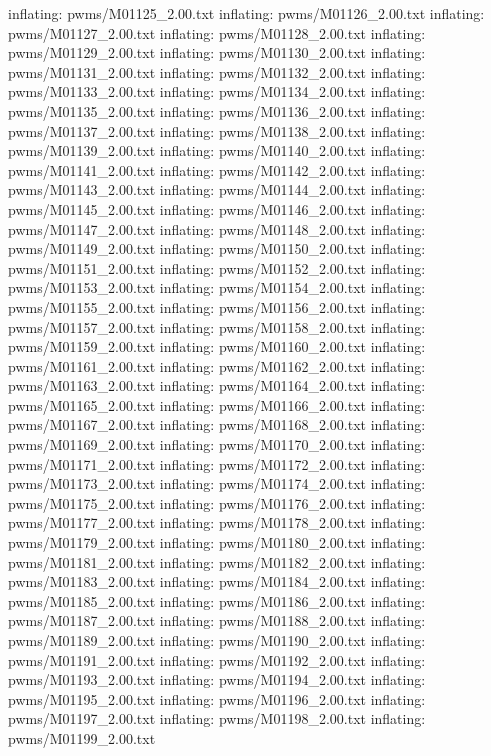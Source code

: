 \documentclass[letterpaper,10pt,english]{sphinxmanual}
\begin{document}
{\begin{sphinxVerbatim}[commandchars=\\\{\}]
  inflating: pwms/M01125\_2.00.txt
  inflating: pwms/M01126\_2.00.txt
  inflating: pwms/M01127\_2.00.txt
  inflating: pwms/M01128\_2.00.txt
  inflating: pwms/M01129\_2.00.txt
  inflating: pwms/M01130\_2.00.txt
  inflating: pwms/M01131\_2.00.txt
  inflating: pwms/M01132\_2.00.txt
  inflating: pwms/M01133\_2.00.txt
  inflating: pwms/M01134\_2.00.txt
  inflating: pwms/M01135\_2.00.txt
  inflating: pwms/M01136\_2.00.txt
  inflating: pwms/M01137\_2.00.txt
  inflating: pwms/M01138\_2.00.txt
  inflating: pwms/M01139\_2.00.txt
  inflating: pwms/M01140\_2.00.txt
  inflating: pwms/M01141\_2.00.txt
  inflating: pwms/M01142\_2.00.txt
  inflating: pwms/M01143\_2.00.txt
  inflating: pwms/M01144\_2.00.txt
  inflating: pwms/M01145\_2.00.txt
  inflating: pwms/M01146\_2.00.txt
  inflating: pwms/M01147\_2.00.txt
  inflating: pwms/M01148\_2.00.txt
  inflating: pwms/M01149\_2.00.txt
  inflating: pwms/M01150\_2.00.txt
  inflating: pwms/M01151\_2.00.txt
  inflating: pwms/M01152\_2.00.txt
  inflating: pwms/M01153\_2.00.txt
  inflating: pwms/M01154\_2.00.txt
  inflating: pwms/M01155\_2.00.txt
  inflating: pwms/M01156\_2.00.txt
  inflating: pwms/M01157\_2.00.txt
  inflating: pwms/M01158\_2.00.txt
  inflating: pwms/M01159\_2.00.txt
  inflating: pwms/M01160\_2.00.txt
  inflating: pwms/M01161\_2.00.txt
  inflating: pwms/M01162\_2.00.txt
  inflating: pwms/M01163\_2.00.txt
  inflating: pwms/M01164\_2.00.txt
  inflating: pwms/M01165\_2.00.txt
  inflating: pwms/M01166\_2.00.txt
  inflating: pwms/M01167\_2.00.txt
  inflating: pwms/M01168\_2.00.txt
  inflating: pwms/M01169\_2.00.txt
  inflating: pwms/M01170\_2.00.txt
  inflating: pwms/M01171\_2.00.txt
  inflating: pwms/M01172\_2.00.txt
  inflating: pwms/M01173\_2.00.txt
  inflating: pwms/M01174\_2.00.txt
  inflating: pwms/M01175\_2.00.txt
  inflating: pwms/M01176\_2.00.txt
  inflating: pwms/M01177\_2.00.txt
  inflating: pwms/M01178\_2.00.txt
  inflating: pwms/M01179\_2.00.txt
  inflating: pwms/M01180\_2.00.txt
  inflating: pwms/M01181\_2.00.txt
  inflating: pwms/M01182\_2.00.txt
  inflating: pwms/M01183\_2.00.txt
  inflating: pwms/M01184\_2.00.txt
  inflating: pwms/M01185\_2.00.txt
  inflating: pwms/M01186\_2.00.txt
  inflating: pwms/M01187\_2.00.txt
  inflating: pwms/M01188\_2.00.txt
  inflating: pwms/M01189\_2.00.txt
  inflating: pwms/M01190\_2.00.txt
  inflating: pwms/M01191\_2.00.txt
  inflating: pwms/M01192\_2.00.txt
  inflating: pwms/M01193\_2.00.txt
  inflating: pwms/M01194\_2.00.txt
  inflating: pwms/M01195\_2.00.txt
  inflating: pwms/M01196\_2.00.txt
  inflating: pwms/M01197\_2.00.txt
  inflating: pwms/M01198\_2.00.txt
  inflating: pwms/M01199\_2.00.txt

\end{sphinxVerbatim}}
\end{document}
